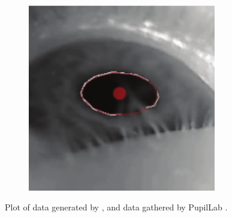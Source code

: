 \documentclass[USenglish,twocolumn]{article}
\begin{document}
\begin{figure}[H]
	\begin{subfigure}[b]{0.45\textwidth}
		\centering
			\includegraphics[width=0.9\textwidth]{img/PupilLab/6.png}
		\caption{}
		\label{fig:experiment3}
	\end{subfigure}
	\caption{Plot of data generated by \cite{Pamplona}, and data gathered by PupilLab  .}	
	\label{fig:experiment}
\end{figure}
\end{document}
